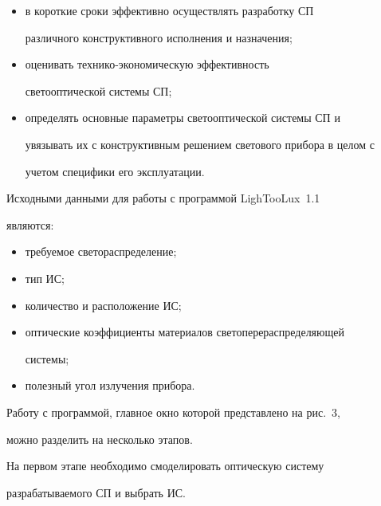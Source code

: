   \begin{itemize}


\item в короткие сроки эффективно осуществлять разработку СП 


различного конструктивного исполнения и назначения;


\item оценивать тех\-ни\-ко-эко\-но\-ми\-че\-скую эффективность 


светооптической системы СП;


\item определять основные параметры светооптической системы СП и 


увязывать их с конструктивным решением светового прибора в целом с 


учетом специфики его эксплуатации.


\end{itemize}





  Исходными данными для работы с программой LighTooLux~1.1 


являются:


  \begin{itemize}


\item требуемое светораспределение;


\item тип ИС;


\item количество и расположение ИС;


\item оптические коэффициенты материалов светоперераспределяющей 


системы;


\item полезный угол излучения прибора.


\end{itemize}





  Работу с программой, главное окно которой представлено на рис.~3, 


можно разделить на несколько этапов.


  


  На первом этапе необходимо смоделировать оптическую систему 


разрабатываемого СП и выбрать ИС. 


